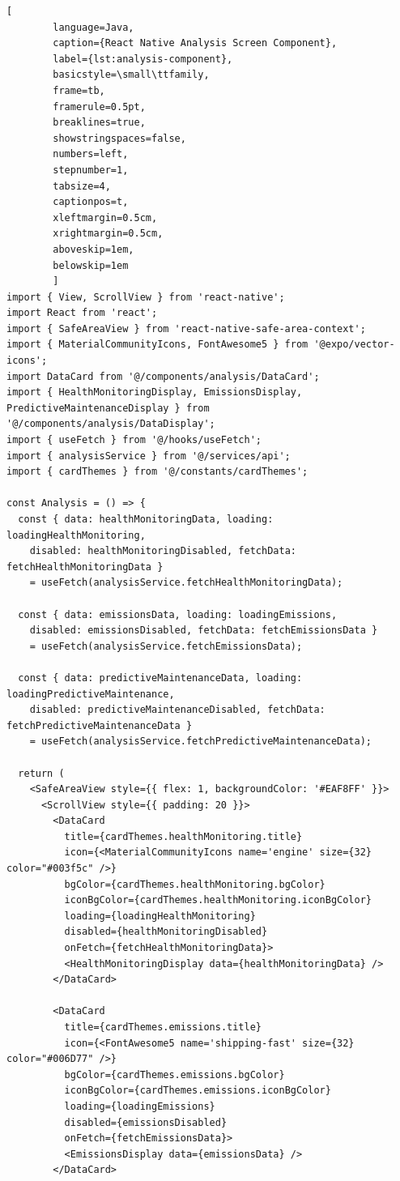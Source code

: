     \begin{lstlisting}[
        language=Java, 
        caption={React Native Analysis Screen Component}, 
        label={lst:analysis-component}, 
        basicstyle=\small\ttfamily,
        frame=tb,
        framerule=0.5pt,
        breaklines=true,
        showstringspaces=false,
        numbers=left,
        stepnumber=1,
        tabsize=4,
        captionpos=t,
        xleftmargin=0.5cm,
        xrightmargin=0.5cm,
        aboveskip=1em,
        belowskip=1em
        ]
import { View, ScrollView } from 'react-native';
import React from 'react';
import { SafeAreaView } from 'react-native-safe-area-context';
import { MaterialCommunityIcons, FontAwesome5 } from '@expo/vector-icons';
import DataCard from '@/components/analysis/DataCard';
import { HealthMonitoringDisplay, EmissionsDisplay, PredictiveMaintenanceDisplay } from '@/components/analysis/DataDisplay';
import { useFetch } from '@/hooks/useFetch';
import { analysisService } from '@/services/api';
import { cardThemes } from '@/constants/cardThemes';

const Analysis = () => {
  const { data: healthMonitoringData, loading: loadingHealthMonitoring, 
    disabled: healthMonitoringDisabled, fetchData: fetchHealthMonitoringData } 
    = useFetch(analysisService.fetchHealthMonitoringData);

  const { data: emissionsData, loading: loadingEmissions, 
    disabled: emissionsDisabled, fetchData: fetchEmissionsData } 
    = useFetch(analysisService.fetchEmissionsData);

  const { data: predictiveMaintenanceData, loading: loadingPredictiveMaintenance, 
    disabled: predictiveMaintenanceDisabled, fetchData: fetchPredictiveMaintenanceData } 
    = useFetch(analysisService.fetchPredictiveMaintenanceData);

  return (
    <SafeAreaView style={{ flex: 1, backgroundColor: '#EAF8FF' }}>
      <ScrollView style={{ padding: 20 }}>
        <DataCard 
          title={cardThemes.healthMonitoring.title}
          icon={<MaterialCommunityIcons name='engine' size={32} color="#003f5c" />}
          bgColor={cardThemes.healthMonitoring.bgColor}
          iconBgColor={cardThemes.healthMonitoring.iconBgColor}
          loading={loadingHealthMonitoring}
          disabled={healthMonitoringDisabled}
          onFetch={fetchHealthMonitoringData}>
          <HealthMonitoringDisplay data={healthMonitoringData} />
        </DataCard>

        <DataCard 
          title={cardThemes.emissions.title}
          icon={<FontAwesome5 name='shipping-fast' size={32} color="#006D77" />}
          bgColor={cardThemes.emissions.bgColor}
          iconBgColor={cardThemes.emissions.iconBgColor}
          loading={loadingEmissions}
          disabled={emissionsDisabled}
          onFetch={fetchEmissionsData}>
          <EmissionsDisplay data={emissionsData} />
        </DataCard>


\end{lstlisting}
